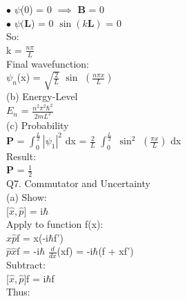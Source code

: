 \documentclass[10pt,fancy]{elegantbook}
\begin{document}
{$\bullet$ $\psi$(0) = 0 $\implies$ $\mathbf {B}$ = 0  \\

$\bullet$ $\psi ( \mathbf {L}$) = 0 $\sin ({k}{\mathbf L})$ = 0  \\
  
So:  \\

    k = $\frac{{n} \pi}{L}$  \\

Final wavefunction: \\
 
$\psi_n$(x) = $\sqrt{\frac{2}{L}}$ $\sin$ $\left( \frac{{n} \pi {x}}{L} \right)$ \\
 
  
(b) Energy-Level \\

$E_n$ = $\frac{n^2 \pi^2 \hbar^2}{2{m}{L}^2}$ \\
 
(c) Probability \\
 
$\mathbf {P}$ = $\int_0^{ \frac{L}{2}}|\psi_1|^2$ dx  
              = $\frac{2}{L}$ $\int_0^{\frac{L}{2}}$ $\sin^2$ $\left( \frac{\pi {x}}{L} \right)$ dx  \\
  
Result:  \\
  
$\mathbf {P}$ = $\frac{1}{2}$  \\

Q7. Commutator and Uncertainty  \\
  
(a) Show: \\ 

    [$\hat {x}, \hat {p}]$ = i$\hbar$  \\

    Apply to function f(x): \\
 
        $\hat {x} \hat {p}$f = x(-i$\hbar$f') \\
 
                                 $\hat {p} \hat {x}$f = -i$\hbar$ $\frac{d}{d{x}}$(xf) = -i$\hbar$(f + xf')  \\
   Subtract:  \\
  
        [$\hat x, \hat p]$f = i$\hbar$f \\
 
   Thus: \\
 
}
\end{document}

